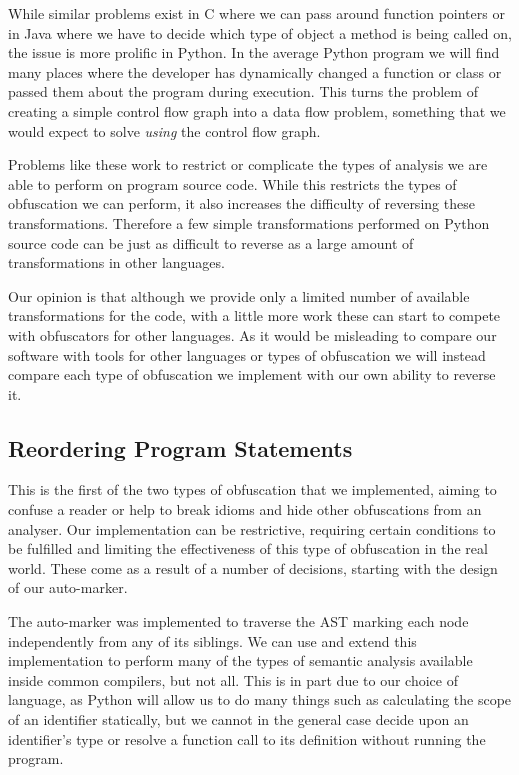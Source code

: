 \documentclass[twoside,a4paper]{report}
\begin{document}
While similar problems exist in C where we can pass around function pointers or in Java where we have to decide which
type of object a method is being called on, the issue is more prolific in Python. In the average Python program we will
find many places where the developer has dynamically changed a function or class or passed them about the program during
execution. This turns the problem of creating a simple control flow graph into a data flow problem, something that we would
expect to solve \textit{using} the control flow graph.

Problems like these work to restrict or complicate the types of analysis we are able to perform on program source code.
While this restricts the types of obfuscation we can perform, it also increases the difficulty of reversing these
transformations. Therefore a few simple transformations performed on Python source code can be just as difficult to reverse as
a large amount of transformations in other languages.

Our opinion is that although we provide only a limited number of available transformations for the code, with a little more work
these can start to compete with obfuscators for other languages. As it would be misleading to compare our software with tools for
other languages or types of obfuscation we will instead compare each type of obfuscation we implement with our own ability to reverse
it.

\subsection{Reordering Program Statements}

This is the first of the two types of obfuscation that we implemented, aiming to confuse a reader or help to break idioms and hide
other obfuscations from an analyser. Our implementation can be restrictive, requiring certain conditions to be fulfilled and limiting
the effectiveness of this type of obfuscation in the real world. These come as a result of a number of decisions, starting with the
design of our auto-marker.

The auto-marker was implemented to traverse the AST marking each node independently from any of its siblings. We can use and extend this implementation
to perform many of the types of semantic analysis available inside common compilers, but not all. This is in part due to our choice of language, as Python
will allow us to do many things such as calculating the scope of an identifier statically, but we cannot in the general case decide upon an identifier's
type or resolve a function call to its definition without running the program.
\end{document}
